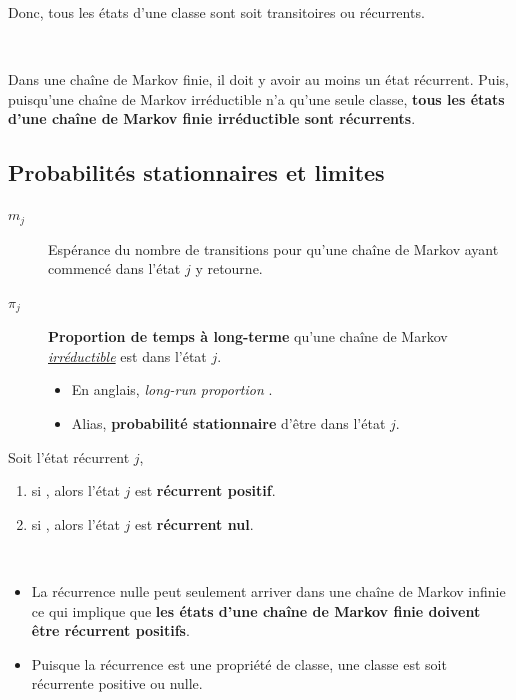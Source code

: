 \documentclass[10pt, french]{article}
\begin{document}
\begin{multicols*}{2}
Donc, tous les états d'une classe sont soit transitoires ou récurrents.

\
 
Dans une chaîne de Markov finie, il doit y avoir au moins un état récurrent. Puis, puisqu'une chaîne de Markov irréductible n'a qu'une seule classe, \textbf{tous les états d'une chaîne de Markov finie irréductible sont récurrents}.


\columnbreak
\subsection{Probabilités stationnaires et limites}
\begin{distributions}[Notation]
\begin{description}
	\item[$m_{j}$]	Espérance du nombre de transitions pour qu'une chaîne de Markov ayant commencé dans l'état $j$ y retourne.
	\item[$\pi_{j}$]	\textbf{Proportion de temps à long-terme} qu'une chaîne de Markov \textit{\underline{irréductible}} est dans l'état $j$.
		\begin{itemize}
		\item	En anglais, \og \textit{long-run proportion} \fg{}.
		\item	Alias, \textbf{probabilité stationnaire} d'être dans l'état $j$.
		\end{itemize}
\end{description}
\end{distributions}

\begin{definitionNOHFILLprop}
Soit l'état récurrent $j$, 
\begin{enumerate}
	\item	si , alors l'état $j$ est \textbf{récurrent positif}.
	\item	si , alors l'état $j$ est \textbf{récurrent nul}.
\end{enumerate}

\

\begin{itemize} 
	\item	La récurrence nulle peut seulement arriver dans une chaîne de Markov infinie ce qui implique que \textbf{les états d'une chaîne de Markov finie doivent être récurrent positifs}.
	\item	Puisque la récurrence est une propriété de classe, une classe est soit récurrente positive ou nulle.
\end{itemize}
\end{definitionNOHFILLprop}



\end{multicols*}
\end{document}
